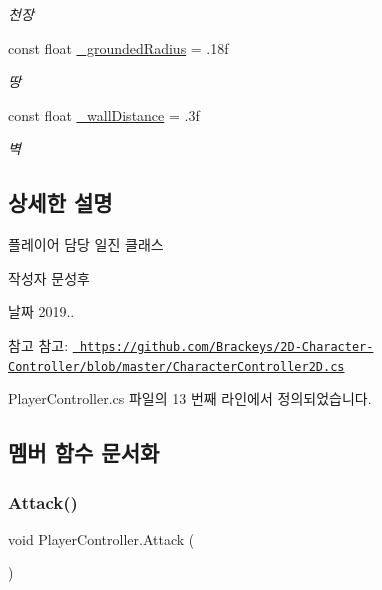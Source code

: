 \begin{DoxyCompactItemize}
\begin{DoxyCompactList}\small\item\em 천장 \end{DoxyCompactList}\item 
const float \mbox{\hyperlink{class_player_controller_a81d04f96edabfd06d6ba1ecb26322f6a}{\+\_\+grounded\+Radius}} = .\+18f
\begin{DoxyCompactList}\small\item\em 땅 \end{DoxyCompactList}\item 
const float \mbox{\hyperlink{class_player_controller_a07f0db2435a8eaeb68c30347135a7a17}{\+\_\+wall\+Distance}} = .\+3f
\begin{DoxyCompactList}\small\item\em 벽 \end{DoxyCompactList}\end{DoxyCompactItemize}


\subsection{상세한 설명}
플레이어 담당 일진 클래스 

\begin{DoxyAuthor}{작성자}
문성후 
\end{DoxyAuthor}
\begin{DoxyDate}{날짜}
2019.. 
\end{DoxyDate}
\begin{DoxySeeAlso}{참고}
참고\+: \href{https://github.com/Brackeys/2D-Character-Controller/blob/master/CharacterController2D.cs}{\texttt{ https\+://github.\+com/\+Brackeys/2\+D-\/\+Character-\/\+Controller/blob/master/\+Character\+Controller2\+D.\+cs}} 
\end{DoxySeeAlso}


Player\+Controller.\+cs 파일의 13 번째 라인에서 정의되었습니다.



\subsection{멤버 함수 문서화}
\mbox{\label{class_player_controller_a473a610cfe2a374d5cb39b3c44881d11}} 
\subsubsection{\texorpdfstring{Attack()}{Attack()}}
{\footnotesize\ttfamily void Player\+Controller.\+Attack (\begin{DoxyParamCaption}{ }\end{DoxyParamCaption})}



